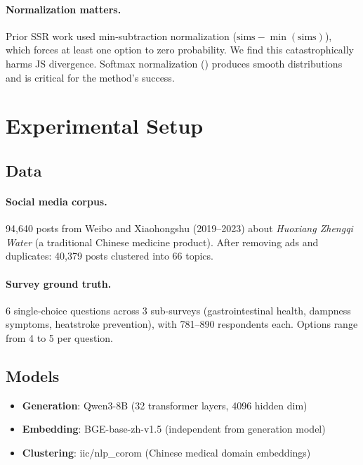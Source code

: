 \documentclass[letterpaper]{article}
\begin{document}
\paragraph{Normalization matters.} Prior SSR work used min-subtraction normalization ($\text{sims} - \min(\text{sims})$), which forces at least one option to zero probability. We find this catastrophically harms JS divergence. Softmax normalization () produces smooth distributions and is critical for the method's success.

\section{Experimental Setup}
\label{sec:setup}

\subsection{Data}

\paragraph{Social media corpus.} 94,640 posts from Weibo and Xiaohongshu (2019--2023) about \emph{Huoxiang Zhengqi Water} (a traditional Chinese medicine product). After removing ads and duplicates: 40,379 posts clustered into 66 topics.

\paragraph{Survey ground truth.} 6 single-choice questions across 3 sub-surveys (gastrointestinal health, dampness symptoms, heatstroke prevention), with 781--890 respondents each. Options range from 4 to 5 per question.

\subsection{Models}

\begin{itemize}[nosep,leftmargin=*]
    \item \textbf{Generation}: Qwen3-8B (32 transformer layers, 4096 hidden dim)
    \item \textbf{Embedding}: BGE-base-zh-v1.5 (independent from generation model)
    \item \textbf{Clustering}: iic/nlp\_corom (Chinese medical domain embeddings)
\end{itemize}
\end{document}
